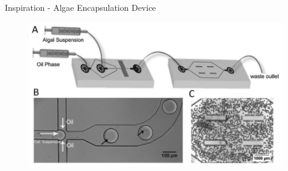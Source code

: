 \documentclass{beamer}
\begin{document}
\begin{frame}{Inspiration - Algae Encapsulation Device}
\begin{figure}
\includegraphics[width=.9\linewidth]{images/algae-droplets.png}\\
\hspace*{11pt}\hbox{\scriptsize {}}
\end{figure}
\end{frame}
\end{document}
